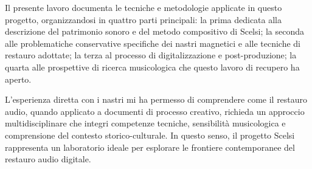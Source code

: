 Il presente lavoro documenta le tecniche e metodologie applicate in questo progetto, organizzandosi in quattro parti principali: la prima dedicata alla descrizione del patrimonio sonoro e del metodo compositivo di Scelsi; la seconda alle problematiche conservative specifiche dei nastri magnetici e alle tecniche di restauro adottate; la terza al processo di digitalizzazione e post-produzione; la quarta alle prospettive di ricerca musicologica che questo lavoro di recupero ha aperto.

L'esperienza diretta con i nastri mi ha permesso di comprendere come il restauro audio, quando applicato a documenti di processo creativo, richieda un approccio multidisciplinare che integri competenze tecniche, sensibilità musicologica e comprensione del contesto storico-culturale. In questo senso, il progetto Scelsi rappresenta un laboratorio ideale per esplorare le frontiere contemporanee del restauro audio digitale.

